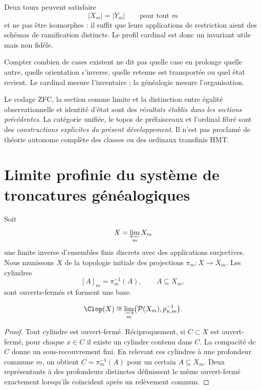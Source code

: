 Deux tours peuvent satisfaire
\[
  |X_m|=|Y_m|\qquad\text{pour tout }m
\]
et ne pas être isomorphes : il suffit que leurs applications de restriction aient des schémas de
ramification distincts. Le profil cardinal est donc un invariant
utile mais non fidèle.

\begin{remark}
Compter combien de cases existent ne dit pas quelle case en prolonge quelle autre, quelle
orientation s'inverse, quelle retenue est transportée ou quel état revient. Le
cardinal mesure l'inventaire ; la généalogie mesure l'organisation.
\end{remark}

\begin{remark}
Le codage ZFC, la section comme limite et la distinction entre égalité
observationnelle et identité d'état sont des
\emph{résultats établis dans les sections précédentes}. La catégorie unifiée, le topos de
préfaisceaux et l'ordinal fibré sont des
\emph{constructions explicites du présent développement}. Il n'est pas proclamé de théorie autonome complète
des classes ou des ordinaux transfinis HMT.
\end{remark}


\section{Limite profinie du système de troncatures généalogiques}

Soit
\[
  X=\varprojlim_mX_m
\]
une limite inverse d'ensembles finis discrets avec des applications surjectives.
Nous munissons \(X\) de la topologie initiale des projections
\(\pi_m:X\to X_m\). Les cylindres
\[
  [A]_m=\pi_m^{-1}(A),
  \qquad A\subseteq X_m,
\]
sont ouverts-fermés et forment une base.

\begin{theorem}
\label{p3-83-c45-s2:thm:clopen-power}
\[
  \Clop(X)
  \cong
  \varinjlim_m\bigl(\mathcal P(X_m),p_{n,m}^{-1}\bigr).
\]
\end{theorem}

\begin{proof}
Tout cylindre est ouvert-fermé. Réciproquement, si \(C\subset X\) est ouvert-fermé, pour
chaque \(x\in C\) il existe un cylindre contenu dans \(C\). La compacité de \(C\)
donne un sous-recouvrement fini. En relevant ces cylindres à une profondeur
commune \(m\), on obtient \(C=\pi_m^{-1}(A)\) pour un certain
\(A\subseteq X_m\). Deux représentants à des profondeurs distinctes définissent le
même ouvert-fermé exactement lorsqu'ils coïncident après un relèvement commun.
\end{proof}

